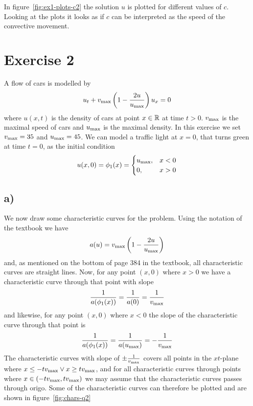     In figure~\ref{fig:ex1-plots-c2} the solution $u$ is plotted for different values of $c$. Looking at the plots it looks as if $c$ can be interpreted as the speed of the convective movement.

    \FloatBarrier

    \section*{Exercise 2}

    A flow of cars is modelled by
    \begin{gather}\label{eq:pde-ex2}
        u_t + v_{\text{max}}\left(1-\frac{2u}{u_{\text{max}}}\right)u_x = 0
    \end{gather}
    where $u(x,t)$ is the density of cars at point $x\in\mathbb{R}$ at time $t>0$. $v_{\text{max}}$ is the maximal speed of cars and $u_{\text{max}}$ is the maximal density. In this exercise we set $v_{\text{max}}=35$ and $u_{\text{max}}=45$. We can model a traffic light at $x=0$, that turns green at time $t=0$, as the initial condition
    \begin{equation}\label{eq:initial-ex2}
        u(x,0) = \phi_1(x) = \begin{cases}
            u_{\text{max}}, & x < 0 \\
            0, & x>0
        \end{cases}
    \end{equation}

    \subsection*{a)}
    We now draw some characteristic curves for the problem. Using the notation of the textbook we have
    \begin{equation*}
        a(u) = v_{\text{max}}\left(1 - \frac{2u}{u_{\text{max}}}\right)
    \end{equation*}
    and, as mentioned on the bottom of page 384 in the textbook, all characteristic curves are straight lines. Now, for any point $(x,0)$ where $x>0$ we have a characteristic curve through that point with slope
    \begin{equation*}
        \frac{1}{a(\phi_1(x))} = \frac{1}{a(0)} = \frac{1}{v_{\text{max}}}
    \end{equation*}
    and likewise, for any point $(x,0)$ where $x<0$ the slope of the characteristic curve through that point is 
    \begin{equation*}
        \frac{1}{a(\phi_1(x))} = \frac{1}{a(u_{\text{max}})} = -\frac{1}{v_{\text{max}}}
    \end{equation*}
    The characteristic curves with slope of $\pm\frac{1}{v_{\text{max}}}$ covers all points in the $xt$-plane where $x\leq-tv_{\text{max}}\lor x\geq tv_{\text{max}}$, and for all characteristic curves through points where $x\in(-tv_{\text{max}},tv_{\text{max}})$ we may assume that the characteristic curves passes through origo. Some of the characteristic curves can therefore be plotted and are shown in figure~\ref{fig:chars-q2}

